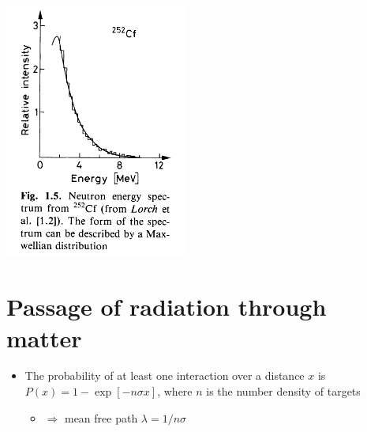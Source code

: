 \begin{itemize}
\begin{center}
  \includegraphics[width=0.45\textwidth,valign=t]{figs/q_neutron.png}
\end{center}
\end{itemize}

\section{Passage of radiation through matter}
\begin{itemize}
  \item The probability of at least one interaction over a distance $x$ is $P(x) = 1-\exp[-n\sigma x]$, where $n$ is the number density of targets
  \begin{itemize}
    \item $\Rightarrow$ mean free path $\lambda = 1/n\sigma$
  \end{itemize}
\end{itemize}
